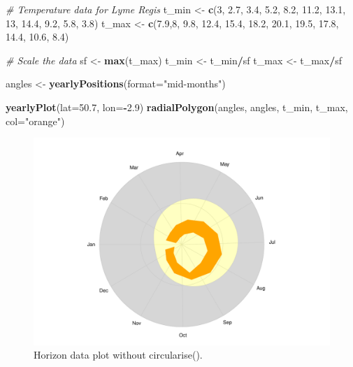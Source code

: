 \documentclass[
]{book}
\newenvironment{Shaded}{\begin{snugshade}}{\end{snugshade}}
\newcommand{\AttributeTok}[1]{\textcolor[rgb]{0.13,0.29,0.53}{#1}}
\newcommand{\CommentTok}[1]{\textcolor[rgb]{0.56,0.35,0.01}{\textit{#1}}}
\newcommand{\DecValTok}[1]{\textcolor[rgb]{0.00,0.00,0.81}{#1}}
\newcommand{\FloatTok}[1]{\textcolor[rgb]{0.00,0.00,0.81}{#1}}
\newcommand{\FunctionTok}[1]{\textcolor[rgb]{0.13,0.29,0.53}{\textbf{#1}}}
\newcommand{\NormalTok}[1]{#1}
\newcommand{\OtherTok}[1]{\textcolor[rgb]{0.56,0.35,0.01}{#1}}
\newcommand{\SpecialCharTok}[1]{\textcolor[rgb]{0.81,0.36,0.00}{\textbf{#1}}}
\newcommand{\StringTok}[1]{\textcolor[rgb]{0.31,0.60,0.02}{#1}}
\begin{document}
\begin{Shaded}
\begin{Highlighting}[]
\CommentTok{\# Temperature data for Lyme Regis}
\NormalTok{t\_min }\OtherTok{\textless{}{-}} \FunctionTok{c}\NormalTok{(}\DecValTok{3}\NormalTok{, }\FloatTok{2.7}\NormalTok{, }\FloatTok{3.4}\NormalTok{, }\FloatTok{5.2}\NormalTok{, }\FloatTok{8.2}\NormalTok{, }\FloatTok{11.2}\NormalTok{, }\FloatTok{13.1}\NormalTok{, }\DecValTok{13}\NormalTok{, }\FloatTok{14.4}\NormalTok{, }\FloatTok{9.2}\NormalTok{, }\FloatTok{5.8}\NormalTok{, }\FloatTok{3.8}\NormalTok{)}
\NormalTok{t\_max }\OtherTok{\textless{}{-}} \FunctionTok{c}\NormalTok{(}\FloatTok{7.9}\NormalTok{,}\DecValTok{8}\NormalTok{, }\FloatTok{9.8}\NormalTok{, }\FloatTok{12.4}\NormalTok{, }\FloatTok{15.4}\NormalTok{, }\FloatTok{18.2}\NormalTok{, }\FloatTok{20.1}\NormalTok{, }\FloatTok{19.5}\NormalTok{, }\FloatTok{17.8}\NormalTok{, }\FloatTok{14.4}\NormalTok{, }\FloatTok{10.6}\NormalTok{, }\FloatTok{8.4}\NormalTok{)}

\CommentTok{\# Scale the data}
\NormalTok{sf }\OtherTok{\textless{}{-}} \FunctionTok{max}\NormalTok{(t\_max)}
\NormalTok{t\_min }\OtherTok{\textless{}{-}}\NormalTok{ t\_min}\SpecialCharTok{/}\NormalTok{sf}
\NormalTok{t\_max }\OtherTok{\textless{}{-}}\NormalTok{ t\_max}\SpecialCharTok{/}\NormalTok{sf}

\NormalTok{angles }\OtherTok{\textless{}{-}} \FunctionTok{yearlyPositions}\NormalTok{(}\AttributeTok{format=}\StringTok{"mid{-}months"}\NormalTok{)}

\FunctionTok{yearlyPlot}\NormalTok{(}\AttributeTok{lat=}\FloatTok{50.7}\NormalTok{, }\AttributeTok{lon=}\SpecialCharTok{{-}}\FloatTok{2.9}\NormalTok{)}
\FunctionTok{radialPolygon}\NormalTok{(angles, angles, t\_min, t\_max, }\AttributeTok{col=}\StringTok{"orange"}\NormalTok{)}
\end{Highlighting}
\end{Shaded}

\begin{figure}

{\centering \includegraphics[width=0.9\linewidth]{_main_files/figure-latex/lyme-temp-1-1} 

}

\caption{Horizon data plot without circularise().}\label{fig:lyme-temp-1}
\end{figure}
\end{document}
